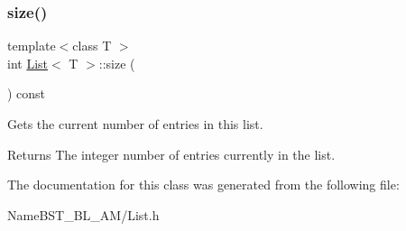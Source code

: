 \subsubsection{\texorpdfstring{size()}{size()}}
{\footnotesize\ttfamily template$<$class T $>$ \\
int \hyperlink{class_list}{List}$<$ T $>$\+::size (\begin{DoxyParamCaption}{ }\end{DoxyParamCaption}) const}

Gets the current number of entries in this list. \begin{DoxyReturn}{Returns}
The integer number of entries currently in the list. 
\end{DoxyReturn}


The documentation for this class was generated from the following file\+:\begin{DoxyCompactItemize}
\item 
Name\+B\+S\+T\+\_\+\+B\+L\+\_\+\+A\+M/List.\+h\end{DoxyCompactItemize}
